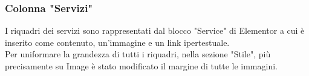 \documentclass{article}
\begin{document}
	\subsubsection{\textbf{Colonna "Servizi"}}
	I riquadri dei servizi sono rappresentati dal blocco "Service" di Elementor a cui è inserito come contenuto, un'immagine e un link ipertestuale.\\
	Per uniformare la grandezza di tutti i riquadri, nella sezione "Stile", più precisamente su Image è stato modificato il margine di tutte le immagini.

	\begin{figure}[H]%
		\centering
		\qquad

\end{figure}
\end{document}
